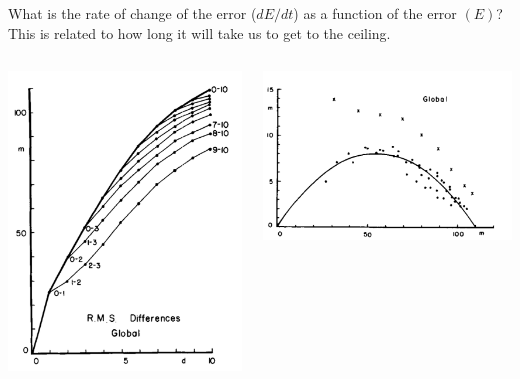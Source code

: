 \documentclass[aspectratio=169]{beamer}
\begin{document}
\begin{frame}

What is the rate of change of the error ($dE/dt$) as a function of the error $(E)$?  This is related to how long it will take us to get to the ceiling.

\begin{columns}[c]
\begin{center}
\includegraphics[height = 0.5\textheight]{figures/lorenz_atmospheric_1982_fig1}
\end{center}
    \pause
    \begin{center}
\begin{center}
\includegraphics[height = 0.5\textheight]{figures/lorenz_atmospheric_1982_fig2}

\end{center}
\end{center}
\end{columns}
\end{frame}
\end{document}
